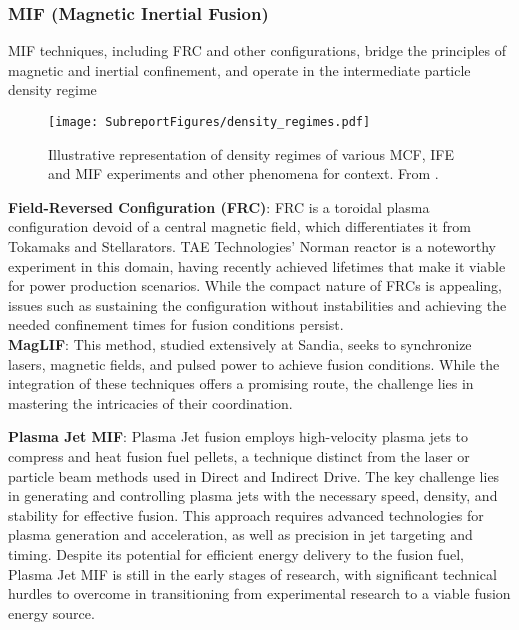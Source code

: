



\subsubsection{MIF (Magnetic Inertial Fusion)}

MIF techniques, including FRC and other configurations, bridge the principles of magnetic and inertial confinement, and operate in the intermediate particle density regime %

\begin{figure}[h!]
    \centering
    \texttt{[image: SubreportFigures/density\_regimes.pdf]}
    \caption{Illustrative representation of density regimes of various MCF, IFE and MIF experiments and other phenomena for context. From \cite{xiao2021stochastic}. }
    \label{fig:climate_gdp}
\end{figure}

\textbf{Field-Reversed Configuration (FRC)}: FRC is a toroidal plasma configuration devoid of a central magnetic field, which differentiates it from Tokamaks and Stellarators. TAE Technologies’ Norman reactor is a noteworthy experiment in this domain, having recently achieved lifetimes that make it viable for power production scenarios. While the compact nature of FRCs is appealing, issues such as sustaining the configuration without instabilities and achieving the needed confinement times for fusion conditions persist.\\

\textbf{MagLIF}: This method, studied extensively at Sandia, seeks to synchronize lasers, magnetic fields, and pulsed power to achieve fusion conditions. While the integration of these techniques offers a promising route, the challenge lies in mastering the intricacies of their coordination.

\textbf{Plasma Jet MIF}: Plasma Jet fusion employs high-velocity plasma jets to compress and heat fusion fuel pellets, a technique distinct from the laser or particle beam methods used in Direct and Indirect Drive. The key challenge lies in generating and controlling plasma jets with the necessary speed, density, and stability for effective fusion. This approach requires advanced technologies for plasma generation and acceleration, as well as precision in jet targeting and timing. Despite its potential for efficient energy delivery to the fusion fuel, Plasma Jet MIF is still in the early stages of research, with significant technical hurdles to overcome in transitioning from experimental research to a viable fusion energy source.

